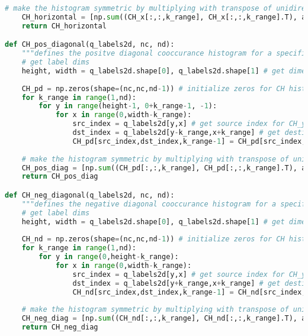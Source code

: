 \begin{lstlisting}[language=Python, caption={Additional functions for Co-occurrence Histogram Detection}, captionpos=b, label={lst:supportCH}]
    # make the histogram symmetric by multiplying with transpose of unidirectional cooccurance histogram
    CH_horizontal = [np.sum((CH_x[:,:,k_range], CH_x[:,:,k_range].T), axis=0) for k_range in range(0,nd-1)]
    return CH_horizontal

def CH_pos_diagonal(q_labels2d, nc, nd):
    """defines the positve diagonal cooccurance histogram for a specifica template according to quantized colourspace labels"""
    # get label dims
    height, width = q_labels2d.shape[0], q_labels2d.shape[1] # get dimensions
    
    CH_pd = np.zeros(shape=(nc,nc,nd-1)) # initialize zeros for CH histogram according to quantizations size
    for k_range in range(1,nd):
        for y in range(height-1, 0+k_range-1, -1):
            for x in range(0,width-k_range):
                src_index = q_labels2d[y,x] # get source index for CH_y at (y,x)
                dst_index = q_labels2d[y-k_range,x+k_range] # get destincation index for CH_y at (y+k,x)
                CH_pd[src_index,dst_index,k_range-1] = CH_pd[src_index,dst_index,k_range-1] + 1 # update histogram count in bin (src_index,dst_index)
    
    # make the histogram symmetric by multiplying with transpose of unidirectional cooccurance histogram
    CH_pos_diag = [np.sum((CH_pd[:,:,k_range], CH_pd[:,:,k_range].T), axis=0) for k_range in range(0,nd-1)]
    return CH_pos_diag

def CH_neg_diagonal(q_labels2d, nc, nd):
    """defines the negative diagonal cooccurance histogram for a specific template according to quantized colourspace labels"""
    # get label dims
    height, width = q_labels2d.shape[0], q_labels2d.shape[1] # get dimensions
        
    CH_nd = np.zeros(shape=(nc,nc,nd-1)) # initialize zeros for CH histogram according to quantizations size
    for k_range in range(1,nd):
        for y in range(0,height-k_range):
            for x in range(0,width-k_range):
                src_index = q_labels2d[y,x] # get source index for CH_y at (y,x)
                dst_index = q_labels2d[y+k_range,x+k_range] # get destincation index for CH_y at (y+k,x)
                CH_nd[src_index,dst_index,k_range-1] = CH_nd[src_index,dst_index,k_range-1] + 1 # update histogram count in bin (src_index,dst_index)
    
    # make the histogram symmetric by multiplying with transpose of unidirectional cooccurance histogram
    CH_neg_diag = [np.sum((CH_nd[:,:,k_range], CH_nd[:,:,k_range].T), axis=0) for k_range in range(0,nd-1)]
    return CH_neg_diag  

\end{lstlisting}

